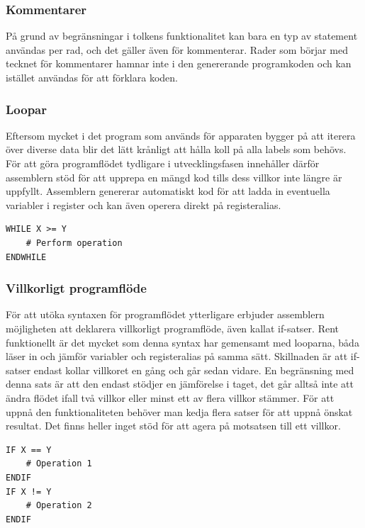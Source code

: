 \documentclass[a4paper]{article}
\begin{document}
    \subsubsection{Kommentarer}
    På grund av begränsningar i tolkens funktionalitet kan bara en typ av
    statement användas per rad, och det gäller även för kommenterar. Rader som
    börjar med tecknet för kommentarer hamnar inte i den genererande
    programkoden och kan istället användas för att förklara koden. 
    \subsubsection{Loopar}
    Eftersom mycket i det program som används för apparaten bygger på att iterera över diverse data
    blir det lätt krånligt att hålla koll på alla labels som behövs. För att göra programflödet
    tydligare i utvecklingsfasen innehåller därför assemblern stöd för att upprepa en mängd kod
    tills dess villkor inte längre är uppfyllt. Assemblern genererar automatiskt kod för att ladda
    in eventuella variabler i register och kan även operera direkt på registeralias.

    \begin{lstlisting}
WHILE X >= Y
    # Perform operation
ENDWHILE
    \end{lstlisting}

    \subsubsection{Villkorligt programflöde}
    För att utöka syntaxen för programflödet ytterligare erbjuder assemblern möjligheten att
    deklarera villkorligt programflöde, även kallat if-satser. Rent funktionellt är det mycket som
    denna syntax har gemensamt med looparna, båda läser in och jämför variabler och registeralias på
    samma sätt. Skillnaden är att if-satser endast kollar villkoret en gång och går sedan vidare.
    En begränsning med denna sats är att den endast stödjer en jämförelse i taget, det går alltså
    inte att ändra flödet ifall två villkor eller minst ett av flera villkor stämmer. För att uppnå
    den funktionaliteten behöver man kedja flera satser för att uppnå önskat resultat. Det finns
    heller inget stöd för att agera på motsatsen till ett villkor.

    \begin{lstlisting}
IF X == Y
    # Operation 1
ENDIF
IF X != Y
    # Operation 2
ENDIF
    \end{lstlisting}
\end{document}
